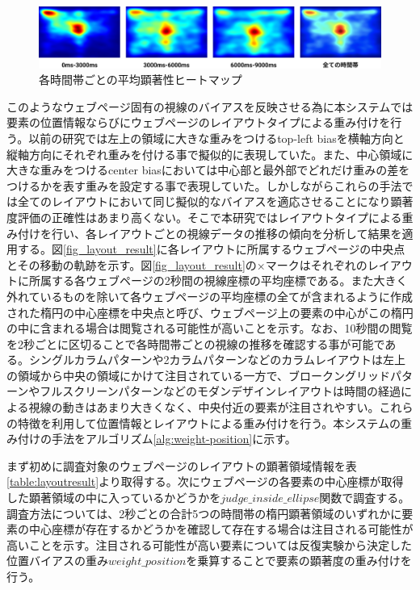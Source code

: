 \begin{figure}[H]
  \centering
  \includegraphics[width=12cm]{figures/06_gazetime.jpg}
  \caption{各時間帯ごとの平均顕著性ヒートマップ}
  \label{fig_gazetime}
\end{figure}

\par このようなウェブページ固有の視線のバイアスを反映させる為に本システムでは要素の位置情報ならびにウェブページのレイアウトタイプによる重み付けを行う。以前の研究\cite{inagaki_icsoft}では左上の領域に大きな重みをつけるtop-left biasを横軸方向と縦軸方向にそれぞれ重みを付ける事で擬似的に表現していた。また、中心領域に大きな重みをつけるcenter biasにおいては中心部と最外部でどれだけ重みの差をつけるかを表す重みを設定する事で表現していた。しかしながらこれらの手法では全てのレイアウトにおいて同じ擬似的なバイアスを適応させることになり顕著度評価の正確性はあまり高くない。そこで本研究ではレイアウトタイプによる重み付けを行い、各レイアウトごとの視線データの推移の傾向を分析して結果を適用する。図\ref{fig_layout_result}に各レイアウトに所属するウェブページの中央点とその移動の軌跡を示す。図\ref{fig_layout_result}の×マークはそれぞれのレイアウトに所属する各ウェブページの2秒間の視線座標の平均座標である。また大きく外れているものを除いて各ウェブページの平均座標の全てが含まれるように作成された楕円の中心座標を中央点と呼び、ウェブページ上の要素の中心がこの楕円の中に含まれる場合は閲覧される可能性が高いことを示す。なお、10秒間の閲覧を2秒ごとに区切ることで各時間帯ごとの視線の推移を確認する事が可能である。シングルカラムパターンや2カラムパターンなどのカラムレイアウトは左上の領域から中央の領域にかけて注目されている一方で、ブロークングリッドパターンやフルスクリーンパターンなどのモダンデザインレイアウトは時間の経過による視線の動きはあまり大きくなく、中央付近の要素が注目されやすい。これらの特徴を利用して位置情報とレイアウトによる重み付けを行う。本システムの重み付けの手法をアルゴリズム\ref{alg:weight-position}に示す。

\par まず初めに調査対象のウェブページのレイアウトの顕著領域情報を表\ref{table:layoutresult}より取得する。次にウェブページの各要素の中心座標が取得した顕著領域の中に入っているかどうかを$judge\_inside\_ellipse$関数で調査する。調査方法については、2秒ごとの合計5つの時間帯の楕円顕著領域のいずれかに要素の中心座標が存在するかどうかを確認して存在する場合は注目される可能性が高いことを示す。注目される可能性が高い要素については反復実験から決定した位置バイアスの重み$weight\_position$を乗算することで要素の顕著度の重み付けを行う。

